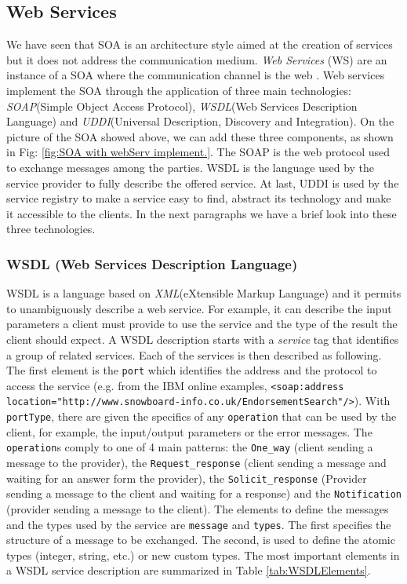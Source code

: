 \subsection{Web Services}
\label{WebServices}
We have seen that SOA is an architecture style aimed at the creation of services but it does not address the communication medium. \textit{Web Services} (WS) are an instance of a SOA where the communication channel is the web \cite{Pernici04}.
Web services implement the SOA through the application of three main technologies: \textit{SOAP}(Simple Object Access Protocol), \textit{WSDL}(Web Services Description Language) and \textit{UDDI}(Universal Description, Discovery and Integration).
On the picture of the SOA showed above, we can add these three components, as shown in Fig: \ref{fig:SOA with webServ implement.}. The SOAP is the web protocol used to exchange messages among the parties. WSDL is the language used by the service provider to fully describe the offered service. At last, UDDI is used by the service registry to make a service easy to find, abstract its technology and make it accessible to the clients.
In the next paragraphs we have a brief look into these three technologies.

\subsubsection{WSDL (Web Services Description Language) }
WSDL is a language based on \textit{XML}(eXtensible Markup Language) and it permits to unambiguously describe a web service. For example, it can describe the input parameters a client must provide to use the service and the type of the result the client should expect. 
A WSDL description starts with a \textit{service} tag that identifies a group of related services. Each of the services is then described as following.\\

The first element is the \verb|port| which identifies the address and the protocol to access the service (e.g. from the IBM online examples,\cite{IBMWSDL} \verb|<soap:address location="http://www.snowboard-info.co.uk/EndorsementSearch"/>|). With \verb|portType|, there are given the specifics of any \verb|operation| that can be used by the client, for example, the input/output parameters or the error messages. The \verb|operation|s comply to one of 4 main patterns: the \verb|One_way| (client sending a message to the provider), the \verb|Request_response| (client sending a message and waiting for an answer form the provider), the \verb|Solicit_response| (Provider sending a message to the client and waiting for a response) and the \verb|Notification| (provider sending a message to the client).
The elements to define the messages and the types used by the service are \verb|message| and \verb|types|. The first specifies the structure of a message to be exchanged. The second, is used to define the atomic types (integer, string, etc.) or new custom types. 
The most important elements in a WSDL service description are summarized in Table \ref{tab:WSDLElements}.\\

